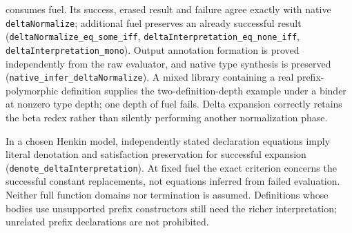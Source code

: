 \documentclass[11pt]{article}
\theoremstyle{definition}
\theoremstyle{remark}
\begin{document}
\begin{enumerate}
  consumes fuel. Its success, erased result and failure agree exactly with
  native \nolinkurl{deltaNormalize}; additional fuel preserves an already
  successful result
  (\nolinkurl{deltaNormalize_eq_some_iff},
  \nolinkurl{deltaInterpretation_eq_none_iff},
  \nolinkurl{deltaInterpretation_mono}). Output annotation formation is proved
  independently from the raw evaluator, and native type synthesis is preserved
  (\nolinkurl{native_infer_deltaNormalize}). A mixed library containing a real
  prefix-polymorphic definition supplies the two-definition-depth example
  under a binder at nonzero type depth; one depth of fuel fails. Delta expansion
  correctly retains the beta redex rather than silently performing another
  normalization phase.

  In a chosen Henkin model, independently stated declaration equations imply
  literal denotation and satisfaction preservation for successful expansion
  (\nolinkurl{denote_deltaInterpretation}). At fixed fuel the exact criterion
  concerns the successful constant replacements, not equations inferred from
  failed evaluation. Neither full function domains nor termination is assumed.
  Definitions whose bodies use unsupported prefix constructors still need the
  richer interpretation; unrelated prefix declarations are not prohibited.


\end{enumerate}
\end{document}
